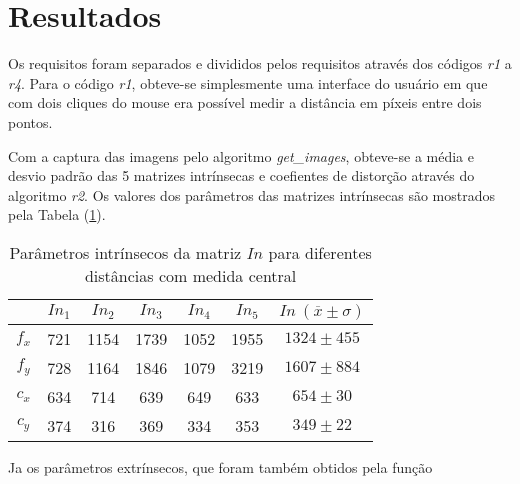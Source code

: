 \section{Resultados}
\label{resultados}


Os requisitos foram separados e divididos pelos requisitos através dos códigos \textit{r1} a \textit{r4}. Para o código \textit{r1}, obteve-se simplesmente uma interface do usuário em que com dois cliques do mouse era possível medir a distância em píxeis entre dois pontos.

Com a captura das imagens pelo algoritmo \textit{get\_images}, obteve-se a média e desvio padrão das 5 matrizes intrínsecas e coefientes de distorção através do algoritmo \textit{r2}. Os valores dos parâmetros das matrizes intrínsecas são mostrados pela Tabela (\ref{tab:intrisec}). 

\begin{table}[!ht]
\centering
\label{tab:intrisec}
\caption{Parâmetros intrínsecos da matriz $In$ para diferentes distâncias com medida central}
\begin{tabular}{c|c|c|c|c|c|c|}
\cline{2-7}
                            & $In_1$ & $In_2$ & $In_3$ & $In_4$ & $In_5$ & $In\ (\overline{x} \pm \sigma)$           \\ \hline
\multicolumn{1}{|c|}{$f_x$} & 721    & 1154   & 1739   & 1052   & 1955   & $1324 \pm 455$ \\ \hline
\multicolumn{1}{|c|}{$f_y$} & 728    & 1164   & 1846   & 1079   & 3219   & $1607 \pm 884$ \\ \hline
\multicolumn{1}{|c|}{$c_x$} & 634    & 714    & 639    & 649    & 633    & $654 \pm 30$   \\ \hline
\multicolumn{1}{|c|}{$c_y$} & 374    & 316    & 369    & 334    & 353    & $349 \pm 22$   \\ \hline
\end{tabular}
\end{table}


Ja os parâmetros extrínsecos, que foram também obtidos pela função



